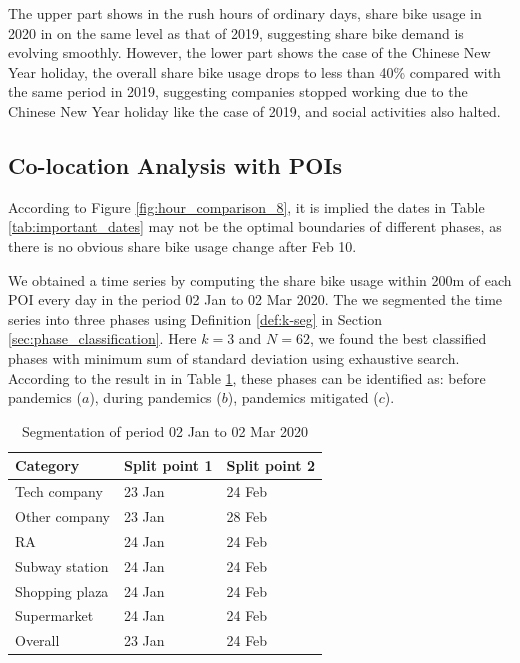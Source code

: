 \documentclass[ijgi,submit,moreauthors,pdftex]{Definitions/mdpi}
\begin{document}
The upper part shows in the rush hours of ordinary days, share bike usage in 2020 in on the same level as that of 2019, suggesting share bike demand is evolving smoothly.
However, the lower part shows the case of the Chinese New Year holiday, the overall share bike usage drops to less than 40\% compared with the same period in 2019, suggesting companies stopped working due to the Chinese New Year holiday like the case of 2019, and social activities also halted. 

\subsection{Co-location Analysis with POIs}\label{sec:colo-poi}

According to Figure \ref{fig:hour_comparison_8}, it is implied the dates in Table \ref{tab:important_dates} may not be the optimal boundaries of different phases, as there is no obvious share bike usage change after Feb 10.

We obtained a time series by computing the share bike usage within 200m of each POI every day in the period 02 Jan to 02 Mar 2020.
The we segmented the time series into three phases using Definition \ref{def:k-seg} in Section \ref{sec:phase_classification}.
Here $k=3$ and $N=62$, we found the best classified phases with minimum sum of standard deviation using exhaustive search.
According to the result in in Table \ref{tab:segment}, these phases can be identified as: before pandemics ($a$), during pandemics ($b$), pandemics mitigated ($c$).

\begin{table}[ht]
	\centering
	\begin{tabular}{|l|l|l|}
		\hline
		Category & Split point 1 & Split point 2\\
		\hline
		Tech company & 23 Jan & 24 Feb\\
		\hline
		Other company & 23 Jan & 28 Feb\\
		\hline
		RA & 24 Jan & 24 Feb\\
		\hline
		Subway station & 24 Jan & 24 Feb\\
		\hline
		Shopping plaza & 24 Jan & 24 Feb\\
		\hline
		Supermarket & 24 Jan & 24 Feb\\
		\hline
		Overall & 23 Jan & 24 Feb \\
		\hline
	\end{tabular}
	\caption{Segmentation of period 02 Jan to 02 Mar 2020}\label{tab:segment}
\end{table}
\end{document}

